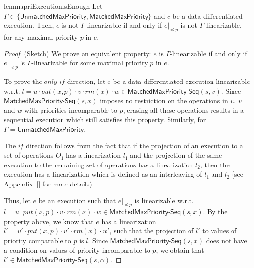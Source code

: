 \begin{restatable}{lemma}{priExecutionIsEnough}
\label{lemma:pri execution is enough}
Let $\Gamma\in \{\mathsf{UnmatchedMaxPriority}, \mathsf{MatchedMaxPriority}\}$ and $e$ be a data-differentiated execution. Then, $e$ is not $\Gamma$-linearizable if and only if $e\vert_{\preceq p}$ is not $\Gamma$-linearizable, for {\color{blue}any} maximal priority $p$ in $e$.
\end{restatable}
\begin {proof} (Sketch) 
{\color {blue}We prove an equivalent property: $e$ is $\Gamma$-linearizable if and only if $e\vert_{\preceq p}$ is $\Gamma$-linearizable for some maximal priority $p$ in $e$.} %

To prove the $\textit{only if}$ direction, let $e$ be a data-differentiated execution linearizable w.r.t. $l = u \cdot \textit{put}(x,p) \cdot v \cdot \textit{rm}(x) \cdot w \in \mathsf{MatchedMaxPriority}\mathsf{\text{-}Seq}(s,x)$. Since $\mathsf{MatchedMaxPriority}\mathsf{\text{-}Seq}(s,x)$ imposes no restriction on the operations in $u$, $v$ and $w$ with priorities incomparable to $p$, erasing all these operations results in a sequential execution which still satisfies this property. Similarly, for $\Gamma=\mathsf{UnmatchedMaxPriority}$.

The $\textit{if}$ direction follows from the fact that if the projection of an execution to a set of operations $O_1$ has a linearization $l_1$ and the projection of the same execution to the remaining set of operations has a linearization $l_2$, then the execution has a linearization which is defined as an interleaving of $l_1$ and $l_2$ (see Appendix~\ref{} for more details).

Thus, let $e$ be an execution such that $e\vert_{\preceq p}$ is linearizable w.r.t. $l = u \cdot \textit{put}(x,p) \cdot v \cdot \textit{rm}(x) \cdot w \in \mathsf{MatchedMaxPriority}\mathsf{\text{-}Seq}(s,x)$. By the property above, we know that $e$ has a linearization $l' = u' \cdot \textit{put}(x,p) \cdot v' \cdot \textit{rm}(x) \cdot w'$, such that the projection of $l'$ to values of priority comparable to $p$ is $l$.
Since $\mathsf{MatchedMaxPriority}\mathsf{\text{-}Seq}(s,x)$ does not have a condition on values of priority incomparable to $p$, we obtain that $l' \in \mathsf{MatchedMaxPriority}\mathsf{\text{-}Seq}(s,\alpha)$.
\end {proof}

